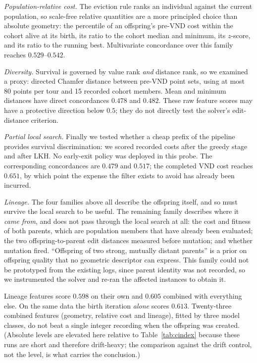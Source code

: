 \documentclass[a4paper,fleqn]{cas-dc}
\begin{document}
\emph{Population-relative cost.} The eviction rule ranks an individual against
the current population, so scale-free relative quantities are a more principled
choice than absolute geometry: the percentile of an offspring's pre-VND cost
within the cohort alive at its birth, its ratio to the cohort median and
minimum, its $z$-score, and its ratio to the running best. Multivariate
concordance over this family reaches $0.529$--$0.542$.

\emph{Diversity.} Survival is governed by value rank \emph{and} distance rank,
so we examined a proxy: directed Chamfer distance between pre-VND point sets,
using at most 80 points per tour and 15 recorded cohort members. Mean and minimum
distances have direct concordances $0.478$ and $0.482$. These raw feature scores
may have a protective direction below $0.5$; they do not directly test the
solver's edit-distance criterion.

\emph{Partial local search.} Finally we tested whether a cheap prefix of the
pipeline provides survival discrimination: we scored recorded costs after
the greedy stage and after LKH. No early-exit policy was deployed in this probe. The corresponding concordances are
$0.479$ and $0.517$; the completed VND cost reaches $0.651$, by which point the expense the
filter exists to avoid has already been incurred.

\emph{Lineage.} The four families above all describe the offspring itself, and
so must survive the local search to be useful. The remaining family describes
where it \emph{came from}, and does not pass through the local search at all:
the cost and fitness of both parents, which are population members that have
already been evaluated; the two offspring-to-parent edit distances measured before mutation; and whether mutation fired. ``Offspring of two
strong, mutually distant parents'' is a prior on offspring quality that no
geometric descriptor can express. This family could not be prototyped from the
existing logs, since parent identity was not recorded, so we instrumented the
solver and re-ran the affected instances to obtain it.

Lineage features score $0.598$ on their own and $0.605$ combined with
everything else. On the same data the birth iteration \emph{alone} scores
$0.613$. Twenty-three combined features (geometry, relative cost and lineage), fitted by
three model classes, do not beat a single integer recording when the offspring
was created. (Absolute levels are elevated here relative to
Table~\ref{tab:cindex} because these runs are short and therefore drift-heavy;
the comparison against the drift control, not the level, is what carries the
conclusion.)
\end{document}
